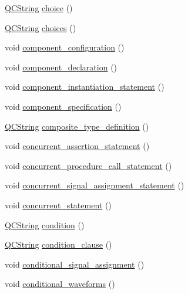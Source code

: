 \begin{DoxyCompactItemize}
\hyperlink{class_q_c_string}{Q\+C\+String} \hyperlink{classvhdl_1_1parser_1_1_vhdl_parser_aa6807f6c196e4515bcb2db0815dc7aa6}{choice} ()
\item 
\hyperlink{class_q_c_string}{Q\+C\+String} \hyperlink{classvhdl_1_1parser_1_1_vhdl_parser_af136803f7feb08865aa717e8638b65cb}{choices} ()
\item 
void \hyperlink{classvhdl_1_1parser_1_1_vhdl_parser_aaf4b26196e80e830dbe722bac79b3948}{component\+\_\+configuration} ()
\item 
void \hyperlink{classvhdl_1_1parser_1_1_vhdl_parser_a94da715172afc3b6c258db49ed8cf3c1}{component\+\_\+declaration} ()
\item 
void \hyperlink{classvhdl_1_1parser_1_1_vhdl_parser_adde755a97c5d26db1a83f67610c86cbd}{component\+\_\+instantiation\+\_\+statement} ()
\item 
void \hyperlink{classvhdl_1_1parser_1_1_vhdl_parser_af08e8b1e48ff69171225964970d1a6eb}{component\+\_\+specification} ()
\item 
\hyperlink{class_q_c_string}{Q\+C\+String} \hyperlink{classvhdl_1_1parser_1_1_vhdl_parser_aa6b1b94c683528def05476d03a8215f4}{composite\+\_\+type\+\_\+definition} ()
\item 
void \hyperlink{classvhdl_1_1parser_1_1_vhdl_parser_a6806e4127f050ffd9ee7e10d18379d66}{concurrent\+\_\+assertion\+\_\+statement} ()
\item 
void \hyperlink{classvhdl_1_1parser_1_1_vhdl_parser_af48b986b5234d389fe7edc6c8b12bf2a}{concurrent\+\_\+procedure\+\_\+call\+\_\+statement} ()
\item 
void \hyperlink{classvhdl_1_1parser_1_1_vhdl_parser_a4d9a9abf094102398a8ef327307ffd84}{concurrent\+\_\+signal\+\_\+assignment\+\_\+statement} ()
\item 
void \hyperlink{classvhdl_1_1parser_1_1_vhdl_parser_ad63422e0d000e73a0d641847370263e7}{concurrent\+\_\+statement} ()
\item 
\hyperlink{class_q_c_string}{Q\+C\+String} \hyperlink{classvhdl_1_1parser_1_1_vhdl_parser_a380b02a21d7ac864d2c0fb17466c27bf}{condition} ()
\item 
\hyperlink{class_q_c_string}{Q\+C\+String} \hyperlink{classvhdl_1_1parser_1_1_vhdl_parser_a2a2127cc803d635a25c6aee5a588797b}{condition\+\_\+clause} ()
\item 
void \hyperlink{classvhdl_1_1parser_1_1_vhdl_parser_a06b60bdaaf53fd91eba74e43e4e43461}{conditional\+\_\+signal\+\_\+assignment} ()
\item 
void \hyperlink{classvhdl_1_1parser_1_1_vhdl_parser_a484ddf338fbd59d5c6e4f582f001dad0}{conditional\+\_\+waveforms} ()

\end{DoxyCompactItemize}
